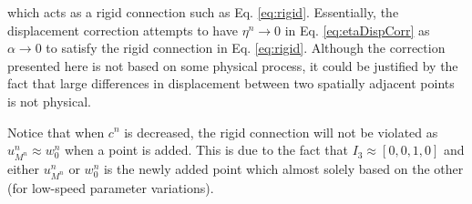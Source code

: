which acts as a rigid connection such as Eq. \eqref{eq:rigid}. Essentially, the displacement correction attempts to have $\eta^n\rightarrow 0$ in Eq. \eqref{eq:etaDispCorr} as $\alpha \rightarrow 0$ to satisfy the rigid connection in Eq. \eqref{eq:rigid}.
Although the correction presented here is not based on some physical process, it could be justified by the fact that large differences in displacement between two spatially adjacent points is not physical. 

Notice that when $c^n$ is decreased, the rigid connection will not be violated as $u_{M^n}^n \approx w_0^n$ when a point is added. This is due to the fact that $I_3\approx [0, 0, 1, 0]$ and either $u_{M^n}^n$ or $w_0^n$ is the newly added point which almost solely based on the other (for low-speed parameter variations).

